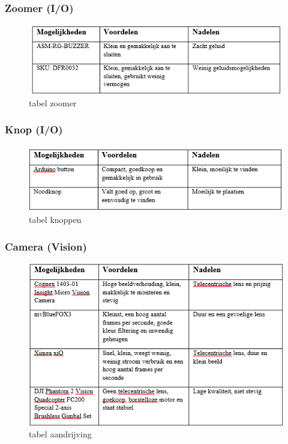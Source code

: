 \documentclass[12pt]{article} %
\begin{document}
\subsubsection{Zoomer (I/O)}
\begin{center}
\begin{figure}[h]
\includegraphics[scale=1.]{tabelZoomer.png}
\caption{tabel zoomer}
\label{fig:deployment}
\end{figure}
\end{center}
\clearpage

\subsubsection{Knop (I/O)}
\begin{center}
\begin{figure}[h]
\includegraphics[scale=1.]{tabelKnop.png}
\caption{tabel knoppen}
\label{fig:deployment}
\end{figure}
\end{center}

\subsubsection{Camera (Vision)}
\begin{center}
\begin{figure}[h]
\includegraphics[scale=1.]{tabelCam.png}
\caption{tabel aandrijving}
\label{fig:deployment}
\end{figure}
\end{center}
\clearpage
\end{document}
